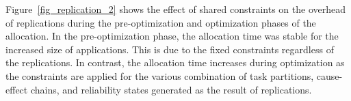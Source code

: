 Figure~\ref{fig_replication_2} shows the effect of shared constraints on the overhead of replications during the pre-optimization and optimization phases of the allocation. In the pre-optimization phase, the allocation time was stable for the increased size of applications. This is due to the fixed constraints regardless of the replications. In contrast, the allocation time increases during optimization as the constraints are applied for the various combination of task partitions, cause-effect chains, and reliability states generated as the result of replications.

%

